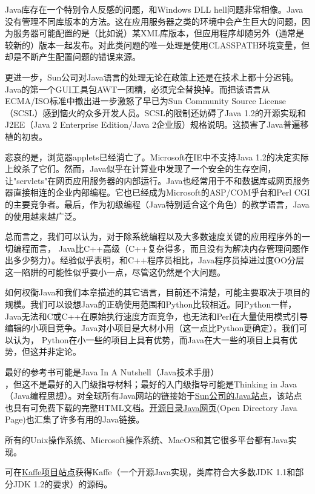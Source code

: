 \documentclass[12pt,oneside]{book}
\begin{document}
Java库存在一个特别令人反感的问题，和Windows DLL hell问题非常相像。Java没有管理不同库版本的方法。这在应用服务器之类的环境中会产生巨大的问题，因为服务器可能配置的是（比如说）某XML库版本，但应用程序却随另外（通常是较新的）版本一起发布。对此类问题的唯一处理是使用CLASSPATH环境变量，但却是不断产生配置问题的错误来源。

更进一步，Sun公司对Java语言的处理无论在政策上还是在技术上都十分迟钝。Java的第一个GUI工具包AWT一团糟，必须完全替换掉。而把该语言从ECMA/ISO标准中撤出进一步激怒了早已为Sun Community Source License（SCSL）感到恼火的众多开发人员。SCSL的限制还妨碍了Java 1.2的开源实现和J2EE（Java 2 Enterprise Edition/Java 2企业版）规格说明。这损害了Java普遍移植的初衷。

悲哀的是，浏览器applets已经消亡了。Microsoft在IE中不支持Java 1.2的决定实际上绞杀了它们。然而，Java似乎在计算业中发现了一个安全的生存空间，让"servlets"在网页应用服务器的内部运行。Java也经常用于不和数据库或网页服务器直接相连的企业内部编程。它也已经成为Microsoft的ASP/COM乎台和Perl CGI的主要竞争者。最后，作为初级编程（Java特别适合这个角色）的教学语言，Java的使用越来越广泛。

总而言之，我们可以认为，对于除系统编程以及大多数速度关键的应用程序外的一切编程而言， Java比C++高级（C++复杂得多，而且没有为解决内存管理问题作出多少努力）。经验似乎表明，和C++程序员相比，Java程序员掉进过度OO分层这一陷阱的可能性似乎要小一点，尽管这仍然是个大问题。

如何权衡Java和我们本章描述的其它语言，目前还不清楚，可能主要取决于项目的规模。我们可以设想Java的正确使用范围和Python比较相近。同Python一样，Java无法和C或C++在原始执行速度方面竞争，也无法和Perl在大量使用模式引导编辑的小项目竞争。Java对小项目是大材小用（这一点比Python更确定）。我们可以认为，
Python在小一些的项目上具有优势，而Java在大一些的项目上具有优势，但这并非定论。

最好的参考书可能是Java In A Nutshell（Java技术手册）\\ \cite{FlanaganJava}，但这不是最好的入门级指导材料；最好的入门级指导可能是Thinking in Java（Java编程思想）\cite{Eckel}。对全球所有Java网站的链接始于\href{http://java.sun.com/}{Sun公司的Java站点}，该站点也具有可免费下载的完整HTML文档。\href{http://dmoz.org/Computers/Programming/Languages/Java/}{开源目录Java网页}(Open Directory Java Page)也汇集了许多有用的Java链接。

所有的Unix操作系统、Microsoft操作系统、MacOS和其它很多平台都有Java实现。

可在\href{http://www.kaffe.org/}{Kaffe项目站点}获得Kaffe（一个开源Java实现，类库符合大多数JDK 1.1和部分JDK 1.2的要求）的源码。
\end{document}
